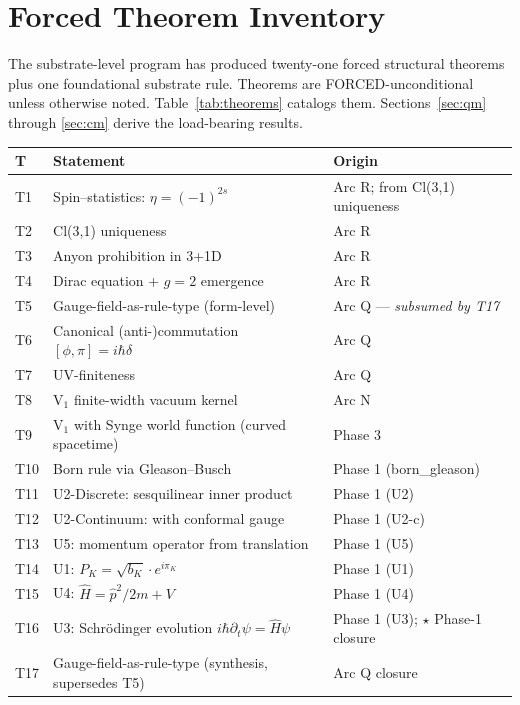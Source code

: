 \documentclass[11pt,a4paper]{article}
\begin{document}
\section{Forced Theorem Inventory}\label{sec:theorems}

The substrate-level program has produced twenty-one forced structural theorems plus one foundational substrate rule. Theorems are FORCED-unconditional unless otherwise noted. Table~\ref{tab:theorems} catalogs them. Sections~\ref{sec:qm} through \ref{sec:cm} derive the load-bearing results.

\begin{table}[h]
\centering
\small
\begin{tabular}{@{}p{0.8cm}p{6.0cm}p{6.0cm}@{}}
\toprule
\textbf{T} & \textbf{Statement} & \textbf{Origin} \\
\midrule
T1 & Spin--statistics: $\eta = (-1)^{2s}$ & Arc R; from Cl(3,1) uniqueness \\
T2 & Cl(3,1) uniqueness & Arc R \\
T3 & Anyon prohibition in 3+1D & Arc R \\
T4 & Dirac equation + $g = 2$ emergence & Arc R \\
T5 & Gauge-field-as-rule-type (form-level) & Arc Q --- \emph{subsumed by T17} \\
T6 & Canonical (anti-)commutation $[\phi,\pi]=i\hbar\delta$ & Arc Q \\
T7 & UV-finiteness & Arc Q \\
T8 & V$_1$ finite-width vacuum kernel & Arc N \\
T9 & V$_1$ with Synge world function (curved spacetime) & Phase 3 \\
T10 & Born rule via Gleason--Busch & Phase 1 (born\_gleason) \\
T11 & U2-Discrete: sesquilinear inner product & Phase 1 (U2) \\
T12 & U2-Continuum: with conformal gauge & Phase 1 (U2-c) \\
T13 & U5: momentum operator from translation & Phase 1 (U5) \\
T14 & U1: $P_K = \sqrt{b_K} \cdot e^{i\pi_K}$ & Phase 1 (U1) \\
T15 & U4: $\hat H = \hat p^2 / 2m + V$ & Phase 1 (U4) \\
T16 & U3: Schr\"odinger evolution $i\hbar \partial_t \psi = \hat H \psi$ & Phase 1 (U3); $\star$ Phase-1 closure \\
T17 & Gauge-field-as-rule-type (synthesis, supersedes T5) & Arc Q closure \\

\end{tabular}
\end{table}
\end{document}
